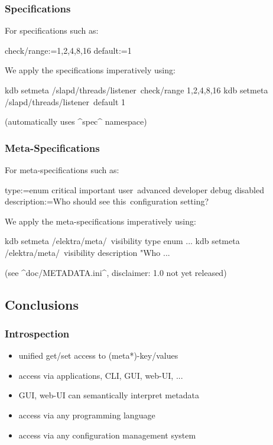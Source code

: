 \begin{frame}[fragile]
	\frametitle{Specifications}
	For specifications such as:

	\begin{code}
	  check/range:=1,2,4,8,16
	  default:=1
	\end{code}

	We apply the specifications imperatively using:

	\begin{code}[language=bash,morekeywords={setmeta}]
	kdb setmeta /slapd/threads/listener\
		check/range 1,2,4,8,16
	kdb setmeta /slapd/threads/listener\
	       	default 1
	\end{code}

	(automatically uses ^spec^ namespace)
\end{frame}

\begin{frame}[fragile]
	\frametitle{Meta-Specifications}
	For meta-specifications such as:

	\small
	\begin{code}
	[visibility]
	type:=enum critical important user\
	      advanced developer debug disabled
	description:=Who should see this\
	     configuration setting?
	\end{code}

	We apply the meta-specifications imperatively using:

	\begin{code}[language=bash,morekeywords={setmeta}]
	kdb setmeta /elektra/meta/\
		visibility type enum ...
	kdb setmeta /elektra/meta/\
		visibility description "Who ...
	\end{code}

	(see ^doc/METADATA.ini^, disclaimer: 1.0 not yet released)
\end{frame}

\subsection{Conclusions}

\begin{frame}
	\frametitle{Introspection}
	\begin{itemize}[<+->]
	\item unified get/set access to (meta*)-key/values
	\item access via applications, CLI, GUI, web-UI, ...
	\item GUI, web-UI can semantically interpret metadata
	\item access via any programming language
	\item access via any configuration management system
	\end{itemize}
\end{frame}

